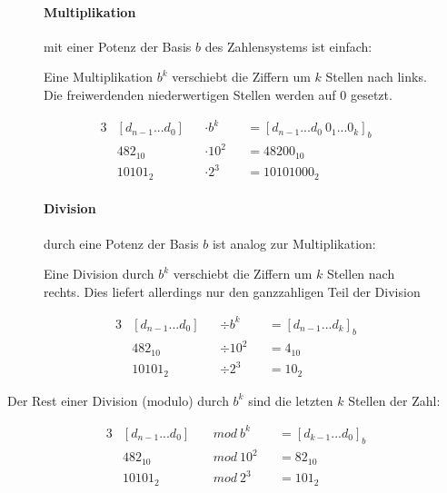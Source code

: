 \documentclass[12pt]{report}
\begin{document}
\begin{figure}[H]
  \begin{minipage}[t]{0.45\textwidth}
    \paragraph{Multiplikation} mit einer Potenz der Basis $b$ des Zahlensystems ist einfach:

    Eine Multiplikation $b^k$ verschiebt die Ziffern um $k$ Stellen nach links.
    Die freiwerdenden niederwertigen Stellen werden auf $0$ gesetzt.

    \begin{alignat*}{3}
       & [d_{n-1}...d_0] &  & \cdot b^k  &  & = [d_{n-1}...d_0\ 0_1 ... 0_k]_b \\
       & 482_{10}        &  & \cdot 10^2 &  & = 48200_{10}                     \\
       & 10101_2         &  & \cdot 2^3  &  & = 10101000_2
    \end{alignat*}
  \end{minipage}
  \hfill
  \begin{minipage}[t]{0.45\textwidth}
    \paragraph{Division} durch eine Potenz der Basis $b$ ist analog zur Multiplikation:

    Eine Division durch $b^k$ verschiebt die Ziffern um $k$ Stellen nach rechts.
    Dies liefert allerdings nur den ganzzahligen Teil der Division

    \begin{alignat*}{3}
       & [d_{n-1}...d_0] &  & \div b^k  &  & = [d_{n-1}...d_k]_b \\
       & 482_{10}        &  & \div 10^2 &  & = 4_{10}            \\
       & 10101_2         &  & \div 2^3  &  & = 10_2
    \end{alignat*}
  \end{minipage}
\end{figure}


Der Rest einer Division (modulo) durch $b^k$ sind die letzten $k$ Stellen der Zahl:

\begin{alignat*}{3}
   & [d_{n-1}...d_0] &  & \ mod\ b^k  &  & = [d_{k-1}...d_0]_b \\
   & 482_{10}        &  & \ mod\ 10^2 &  & = 82_{10}           \\
   & 10101_2         &  & \ mod\ 2^3  &  & = 101_2
\end{alignat*}
\end{document}
